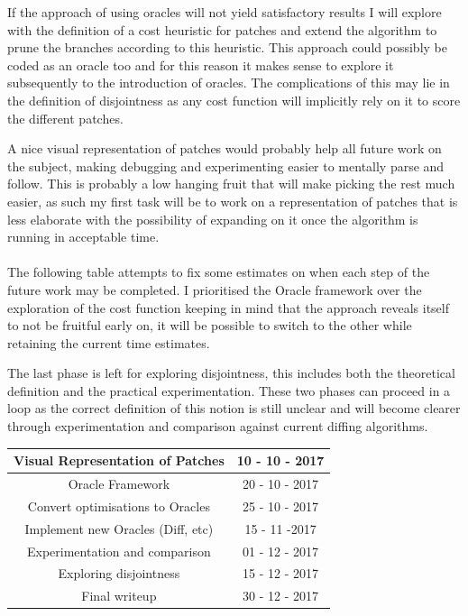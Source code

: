 \documentclass[11pt]{article}
\begin{document}
If the approach of using oracles will not yield satisfactory results I will explore with the definition of a cost heuristic
for patches and extend the algorithm to prune the branches according to this heuristic. This approach could 
possibly be coded as an oracle too and for this reason it makes sense to explore it subsequently to the introduction
of oracles. The complications of this may lie in the definition of disjointness 
as any cost function will implicitly rely on it to score the different patches. 

A nice visual representation of patches would probably help all future work on the subject, making debugging and 
experimenting easier to mentally parse and follow. This is probably a low 
hanging fruit that will make picking the rest much easier, as such my first task 
will be to work on a representation of patches that is less elaborate with 
the possibility of expanding on it once the algorithm is running in acceptable 
time.
\\\\
The following table attempts to fix some estimates on when each step of the 
future work may be completed. I prioritised the Oracle framework over the 
exploration of the cost function keeping in mind that the approach reveals 
itself to not be fruitful early on, it will be possible to switch to the other 
while retaining the current time estimates.

The last phase is left for exploring disjointness, this includes both the theoretical 
definition and the practical experimentation. These two 
phases can proceed in a loop as the correct definition of this notion is still 
unclear and will become clearer through experimentation and comparison against 
current diffing algorithms.


\begin{center}
 \begin{tabular} { ||c|c|| }
   \hline Visual Representation of Patches & 10 - 10 - 2017 \\
   \hline
   \hline Oracle Framework & 20 - 10 - 2017 \\ 
   \hline Convert optimisations to Oracles & 25 - 10 - 2017 \\
   \hline Implement new Oracles (Diff, etc) & 15 - 11 -2017 \\ 
   \hline Experimentation and comparison & 01 - 12 - 2017 \\ 
   \hline
   \hline Exploring disjointness & 15 - 12 - 2017 \\
   \hline
   \hline Final writeup & 30 - 12 - 2017 \\
   \hline
 \end{tabular}
\end{center}
\end{document}

